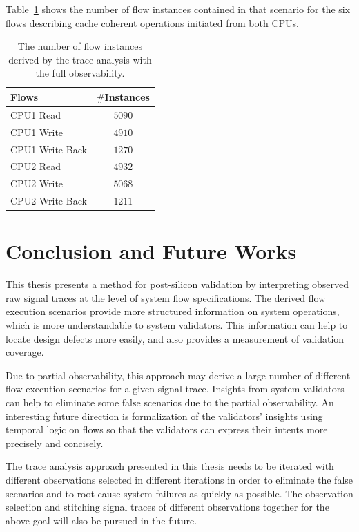\documentclass[12pt,frontmatter,copyright,thesis]{usfmanus}
\begin{document}
Table~\ref{table-case-3} shows the number of flow instances contained in that
scenario for the six 
flows describing cache coherent operations initiated from both CPUs.
\begin{table}[tb]
\caption{The number of flow instances derived by the trace analysis with the full observability.}
\begin{center}
\begin{tabular}{|l|c|}
\hline
Flows & $\#$Instances \\
\hline
\hline
CPU1 Read			&  $5090$\\
CPU1 Write				&  $4910$\\
CPU1 Write Back				&  $1270$\\

\hline
CPU2 Read			&  $4932$\\
CPU2 Write				&  $5068$\\
CPU2 Write Back				&  $1211$\\
\hline
\end{tabular}
\end{center}
\label{table-case-3}
\end{table}%




\chapter{Conclusion and Future Works}
This thesis presents a method for post-silicon validation by
interpreting observed raw signal traces at the level of
system flow specifications.  The derived flow execution
scenarios provide more structured information on system
operations, which is more understandable to system
validators.  This information can help to locate design
defects more easily, and also provides a measurement of
validation coverage.

Due to partial observability, this approach may derive a
large number of different flow execution scenarios for a
given signal trace.  Insights from system validators can
help to eliminate some false scenarios due to the partial
observability.  An interesting future direction is
formalization of the validators' insights using temporal
logic on flows so that the validators can express their
intents more precisely and concisely.

The trace analysis approach presented in this thesis needs to
be iterated with different observations selected in
different iterations in order to eliminate the false
scenarios and to root cause system failures as quickly as
possible.  The observation selection and stitching signal
traces of different observations together for the above goal
will also be pursued in the future.
\end{document}
